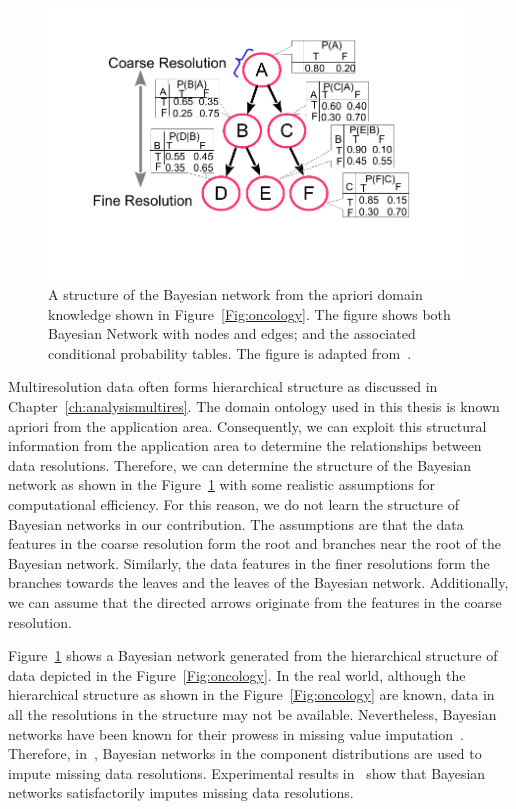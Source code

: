 \begin{figure}[h!]
\centering
\includegraphics[trim=15mm 20mm 20mm 5mm,width=0.99\textwidth]{figures/bnnfig1}
\caption[Bayesian Network from Domain Knowledge.]
{A structure of the Bayesian network from the apriori domain 
knowledge shown in Figure~\ref{Fig:oncology}. The figure shows both
Bayesian Network with nodes and edges; and the associated conditional 
probability tables. The figure is adapted from~. } 
\label{Fig:oncobnn}
\end{figure}


Multiresolution data often forms hierarchical structure  as discussed
in Chapter~\ref{ch:analysismultires}. The domain ontology used in this 
thesis is known apriori from the application area. Consequently, we 
can exploit this structural information from the application area to 
determine the relationships between data resolutions. Therefore,
we can determine the structure of the Bayesian network as shown in the  
Figure~\ref{Fig:oncobnn} with some realistic assumptions for computational
efficiency. For this reason, we do not learn the structure of Bayesian 
networks in our contribution. The  assumptions are that the data features 
in the coarse resolution form the root and branches near the root of 
the Bayesian network. Similarly, the data features in the finer 
resolutions form the branches towards the  leaves and the leaves
of the Bayesian network. Additionally, we can assume that the  
directed arrows originate from the features in the coarse 
resolution. 

 
Figure~\ref{Fig:oncobnn} shows a Bayesian network generated 
from the hierarchical structure of data depicted in the 
Figure~\ref{Fig:oncology}. In the real world, although the hierarchical 
structure as shown in the Figure~\ref{Fig:oncology} are known, 
data in all the resolutions in the structure may not be available. 
Nevertheless, Bayesian networks have been known for their prowess 
in missing value imputation~\cite{dizio2004}. Therefore, in~, 
Bayesian networks in the component distributions are used to 
impute missing data resolutions. Experimental results in~ 
show that Bayesian networks satisfactorily imputes missing data 
resolutions.

